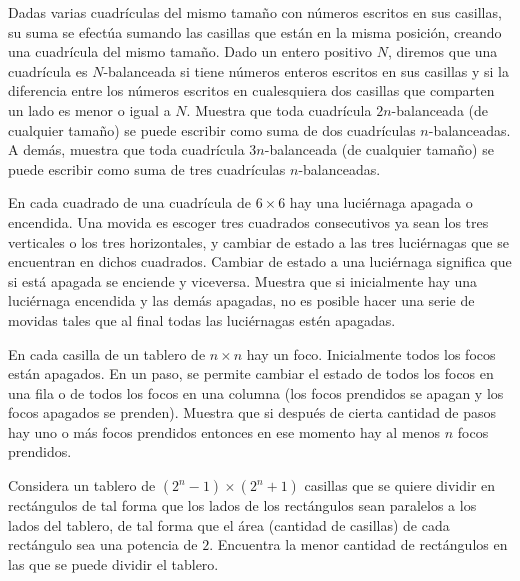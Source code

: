 \documentclass[11pt]{scrartcl}
\begin{document}
\begin{problem}
    [2005/2]
    Dadas varias cuadrículas del mismo tamaño con números escritos en sus casillas, su suma se efectúa sumando las casillas que están en la misma posición, creando una cuadrícula del mismo tamaño.
Dado un entero positivo $N$, diremos que una cuadrícula es $N$-balanceada si tiene números enteros escritos en sus casillas y si la diferencia entre los números escritos en cualesquiera dos casillas que comparten un lado es menor o igual a $N$. Muestra que toda cuadrícula $2n$-balanceada (de cualquier tamaño) se puede escribir como suma de dos cuadrículas $n$-balanceadas. A demás, muestra que toda cuadrícula $3n$-balanceada (de cualquier tamaño) se puede escribir como suma de tres cuadrículas $n$-balanceadas.
\end{problem}
\begin{problem}
    [2007/5] 
    En cada cuadrado de una cuadrícula de $6 \times 6$ hay una luciérnaga apagada o encendida.
Una movida es escoger tres cuadrados consecutivos ya sean los tres verticales o los tres
horizontales, y cambiar de estado a las tres luciérnagas que se encuentran en dichos
cuadrados. Cambiar de estado a una luciérnaga significa que si está apagada se enciende
y viceversa.
Muestra que si inicialmente hay una luciérnaga encendida y las demás apagadas, no es
posible hacer una serie de movidas tales que al final todas las luciérnagas estén apagadas.
\end{problem}
\begin{problem}
    [2010/2]
    En cada casilla de un tablero de $n \times n$ hay un foco. Inicialmente todos los focos están
apagados. En un paso, se permite cambiar el estado de todos los focos en una fila o de
todos los focos en una columna (los focos prendidos se apagan y los focos apagados se
prenden).
Muestra que si después de cierta cantidad de pasos hay uno o más focos prendidos entonces
en ese momento hay al menos $n$ focos prendidos.
\end{problem}
\begin{problem}
    [2011/5] 
    Considera un tablero de $(2^n - 1) \times (2^n + 1)$ casillas que se quiere dividir en rectángulos
de tal forma que los lados de los rectángulos sean paralelos a los lados del tablero, de
tal forma que el área (cantidad de casillas) de cada rectángulo sea una potencia de $2$.
Encuentra la menor cantidad de rectángulos en las que se puede dividir el tablero.
\end{problem}
\end{document}
